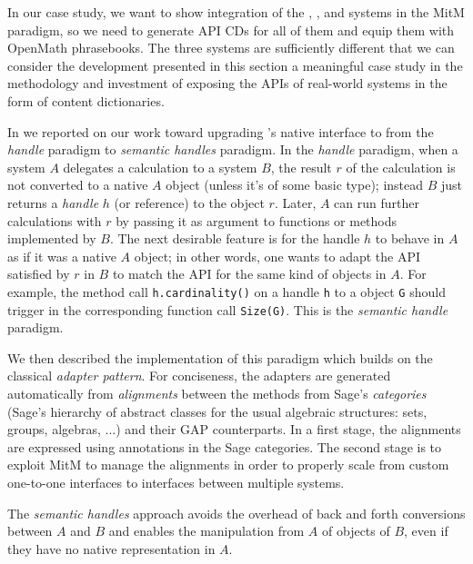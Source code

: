 In our case study, we want to show integration of the \GAP, \Singular, and \Sage systems
in the MitM paradigm, so we need to generate API CDs for all of them and equip them with
OpenMath phrasebooks. The three systems are sufficiently different that we can consider
the development presented in this section a meaningful case study in the methodology and
investment of exposing the APIs of real-world systems in the form of \OMMT content
dictionaries.


In \cite{DehKohKon:iop16} we reported on our work toward upgrading
\Sage's native interface to \GAP from the \emph{handle} paradigm to
\emph{semantic handles} paradigm. In the \emph{handle} paradigm, when
a system $A$ delegates a calculation to a system $B$, the result $r$
of the calculation is not converted to a native $A$ object (unless
it's of some basic type); instead $B$ just returns a \emph{handle} $h$
(or reference) to the object $r$. Later, $A$ can run further
calculations with $r$ by passing it as argument to functions or
methods implemented by $B$. The next desirable feature is for the
handle $h$ to behave in $A$ as if it was a native $A$ object; in other
words, one wants to adapt the API satisfied by $r$ in $B$ to match the
API for the same kind of objects in $A$. For example, the method call
\texttt{h.cardinality()} on a \Sage handle \texttt{h} to a \GAP object
\texttt{G} should trigger in \GAP the corresponding function call
\texttt{Size(G)}. This is the \emph{semantic handle} paradigm.

We then described the implementation of this paradigm which builds on
the classical \emph{adapter pattern}. For conciseness, the adapters
are generated automatically from \emph{alignments} between the methods
from Sage's \emph{categories} (Sage's hierarchy of abstract classes
for the usual algebraic structures: sets, groups, algebras, ...) and
their GAP counterparts. In a first stage, the alignments are expressed
using annotations in the Sage categories. The second stage is to
exploit MitM to manage the alignments in order to properly scale from
custom one-to-one interfaces to interfaces between multiple systems.

The \emph{semantic handles} approach avoids the overhead of back and
forth conversions between $A$ and $B$ and enables the manipulation
from $A$ of objects of $B$, even if they have no native representation
in $A$.

